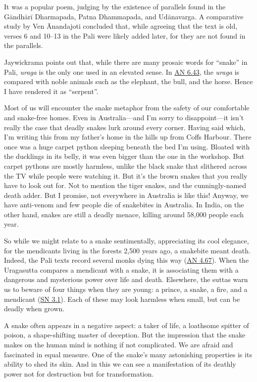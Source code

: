\documentclass[12pt,openany]{book}%
\begin{document}
It was a popular poem, judging by the existence of parallels found in the \textsanskrit{Gāndhārī} Dharmapada, Patna Dhammapada, and \textsanskrit{Udānavarga}. A comparative study by Ven Ānandajoti concluded that, while agreeing that the text is old, verses 6 and 10–13 in the Pali were likely added later, for they are not found in the parallels.

Jaywickrama points out that, while there are many prosaic words for “snake” in Pali, \textit{uraga} is the only one used in an elevated sense. In \href{https://suttacentral.net/an6.43/en/sujato}{AN 6.43}, the \textit{uraga} is compared with noble animals such as the elephant, the bull, and the horse. Hence I have rendered it as “serpent”.

Most of us will encounter the snake metaphor from the safety of our comfortable and snake-free homes. Even in Australia—and I’m sorry to disappoint—it isn’t really the case that deadly snakes lurk around every corner. Having said which, I’m writing this from my father’s home in the hills up from Coffs Harbour. There once was a huge carpet python sleeping beneath the bed I’m using. Bloated with the ducklings in its belly, it was even bigger than the one in the workshop. But carpet pythons are mostly harmless, unlike the black snake that slithered across the TV while people were watching it. But it’s the brown snakes that you really have to look out for. Not to mention the tiger snakes, and the cunningly-named death adder. But I promise, not everywhere in Australia is like this! Anyway, we have anti-venom and few people die of snakebites in Australia. In India, on the other hand, snakes are still a deadly menace, killing around 58,000 people each year.

So while we might relate to a snake sentimentally, appreciating its cool elegance, for the mendicants living in the forests 2,500 years ago, a snakebite meant death. Indeed, the Pali texts record several monks dying this way (\href{https://suttacentral.net/an4.67}{AN 4.67}). When the Uragasutta compares a mendicant with a snake, it is associating them with a dangerous and mysterious power over life and death. Elsewhere, the suttas warn us to beware of four things when they are young: a prince, a snake, a fire, and a mendicant (\href{https://suttacentral.net/sn3.1}{SN 3.1}). Each of these may look harmless when small, but can be deadly when grown.

A snake often appears in a negative aspect: a taker of life, a loathsome spitter of poison, a shape-shifting master of deception. But the impression that the snake makes on the human mind is nothing if not complicated. We are afraid and fascinated in equal measure. One of the snake’s many astonishing properties is its ability to shed its skin. And in this we can see a manifestation of its deathly power not for destruction but for transformation.
\end{document}
